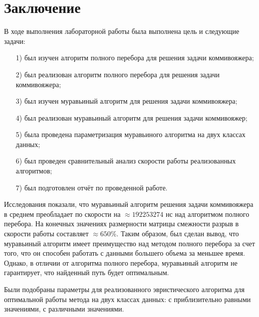 \documentclass[12pt]{report}
\begin{document}
\chapter*{Заключение}
В ходе выполнения лабораторной работы была выполнена цель и следующие задачи:
\begin{enumerate}
\item[1)] был изучен алгоритм полного перебора для решения задачи коммивояжера;
\item[2)] был реализован алгоритм полного перебора для решения задачи коммивояжера;
\item[3)] был изучен муравьиный алгоритм для решения задачи коммивояжера;
\item[4)] был реализован муравьиный алгоритм для решения задачи коммивояжер;
\item[5)] была проведена параметризация муравьиного алгоритма на двух классах данных;
\item[6)] был проведен сравнительный анализ скорости работы реализованных алгоритмов;
\item[7)] был подготовлен отчёт по проведенной работе.
\end{enumerate}

Исследования показали, что муравьиный алгоритм решения задачи коммивояжера в среднем преобладает по скорости на $\approx 192253274$ нс над алгоритмом полного перебора. На конечных значениях размерности матрицы смежности разрыв в скорости работы составляет $\approx 650\%$.
Таким образом, был сделан вывод, что муравьиный алгоритм имеет преимущество над методом полного перебора за счет того, что он способен работать с данными большего объема за меньшее время. Однако, в отличии от алгоритма полного перебора, муравьиный алгоритм не гарантирует, что найденный путь будет оптимальным.

Были подобраны параметры для реализованного эвристического алгоритма для оптимальной работы метода на двух классах данных: с приблизительно равными значениями, с различными значениями.

\end{document}
